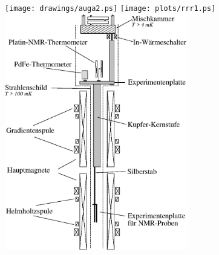 \usepackage[dvips]{graphicx}	

	\texttt{[image: drawings/auga2.ps]}
	\texttt{[image: plots/rrr1.ps]}
	\includegraphics[width=0.6\textwidth]{drawings/kryo}
